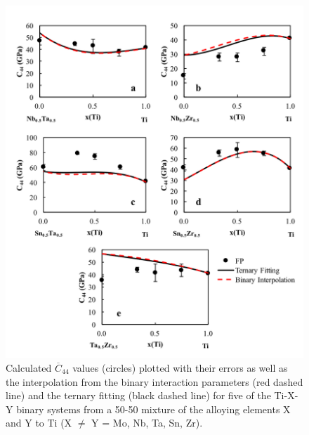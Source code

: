 \pagebreak
\begin{figure}[H]
	\centering
	\includegraphics[width=\textwidth]{Chapter-6/Figures/tixyc442.png}
	\caption{Calculated $\overline{C}_{44}$ values (circles) plotted with their errors as well as the interpolation from the binary interaction parameters (red dashed line) and the ternary fitting (black dashed line) for five of the Ti-X-Y binary systems from a 50-50 mixture of the alloying elements X and Y to Ti (X $\neq$ Y = Mo, Nb, Ta, Sn, Zr).}
	\label{Ch6-figure:tixyc44_2}
\end{figure}

